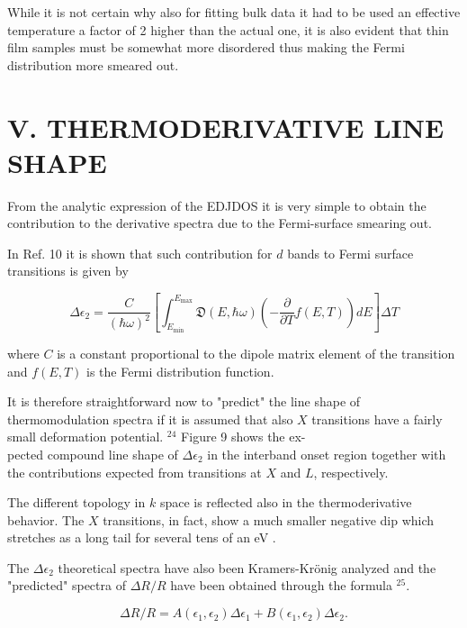\documentclass[10pt]{article}
\begin{document}
While it is not certain why also for fitting bulk data it had to be used an effective temperature a factor of 2 higher than the actual one, it is also evident that thin film samples must be somewhat more disordered thus making the Fermi distribution more smeared out.

\section*{V. THERMODERIVATIVE LINE SHAPE}
From the analytic expression of the EDJDOS it is very simple to obtain the contribution to the derivative spectra due to the Fermi-surface smearing out.

In Ref. 10 it is shown that such contribution for $d$ bands to Fermi surface transitions is given by


\begin{equation*}
\Delta \epsilon_{2}=\frac{C}{(\hbar \omega)^{2}}\left[\int_{E_{\min }}^{E_{\max }} \mathfrak{D}(E, \hbar \omega)\left(-\frac{\partial}{\partial T} f(E, T)\right) d E\right] \Delta T \tag{11}
\end{equation*}


where $C$ is a constant proportional to the dipole matrix element of the transition and $f(E, T)$ is the Fermi distribution function.

It is therefore straightforward now to "predict" the line shape of thermomodulation spectra if it is assumed that also $X$ transitions have a fairly small deformation potential. ${ }^{24}$ Figure 9 shows the ex-\\
pected compound line shape of $\Delta \epsilon_{2}$ in the interband onset region together with the contributions expected from transitions at $X$ and $L$, respectively.

The different topology in $k$ space is reflected also in the thermoderivative behavior. The $X$ transitions, in fact, show a much smaller negative dip which stretches as a long tail for several tens of an eV .

The $\Delta \epsilon_{2}$ theoretical spectra have also been Kramers-Krönig analyzed and the "predicted" spectra of $\Delta R / R$ have been obtained through the formula ${ }^{25}$.


\begin{equation*}
\Delta R / R=A\left(\epsilon_{1}, \epsilon_{2}\right) \Delta \epsilon_{1}+B\left(\epsilon_{1}, \epsilon_{2}\right) \Delta \epsilon_{2} . \tag{12}
\end{equation*}
\end{document}
